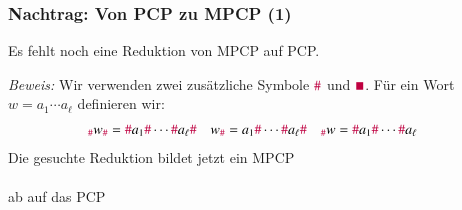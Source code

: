 \documentclass[onlymath]{beamer}
\begin{document}
\begin{frame}[t]\frametitle{Nachtrag: Von PCP zu MPCP (1)}

Es fehlt noch eine Reduktion von MPCP auf PCP.\bigskip


\pause\emph{Beweis:} Wir verwenden zwei zusätzliche Symbole $\mathtt{\textcolor{purple}{\#}}$ und 
$\mathtt{\textcolor{purple}{\blacksquare}}$. Für ein Wort $w=a_1\cdots a_\ell$
definieren wir:
\begin{align*}
{}_{\mathtt{\textcolor{purple}{\#}}}w_{\mathtt{\textcolor{purple}{\#}}} &= \mathtt{\textcolor{purple}{\#}}{a_1}\mathtt{\textcolor{purple}{\#}}\cdots\mathtt{\textcolor{purple}{\#}}{a_\ell}\mathtt{\textcolor{purple}{\#}} &
w_{\mathtt{\textcolor{purple}{\#}}} &= {a_1}\mathtt{\textcolor{purple}{\#}}\cdots\mathtt{\textcolor{purple}{\#}}{a_\ell}\mathtt{\textcolor{purple}{\#}} &
{}_{\mathtt{\textcolor{purple}{\#}}}w &= \mathtt{\textcolor{purple}{\#}}{a_1}\mathtt{\textcolor{purple}{\#}}\cdots\mathtt{\textcolor{purple}{\#}}{a_\ell}
\end{align*}
\pause Die gesuchte Reduktion bildet jetzt ein MPCP\\[1ex]
\narrowcentering{$\left[\begin{matrix}x_1\\y_1\end{matrix}\right]\quad\ldots\quad\left[\begin{matrix}x_k\\y_k\end{matrix}\right]$}\\[1ex]
ab auf das PCP\\[1ex]
\\[1ex]


\end{frame}
\end{document}
